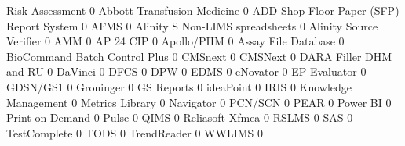 \documentclass{article}
\begin{document}
\begin{Schunk}
\begin{Soutput}
                                           Risk Assessment
                                                         0
  Abbott Transfusion Medicine                            0
  ADD Shop Floor Paper (SFP) Report System               0
  AFMS                                                   0
  Alinity S Non-LIMS spreadsheets                        0
  Alinity Source Verifier                                0
  AMM                                                    0
  AP 24 CIP                                              0
  Apollo/PHM                                             0
  Assay File Database                                    0
  BioCommand Batch Control Plus                          0
  CMSnext                                                0
  CMSNext                                                0
  DARA Filler DHM and RU                                 0
  DaVinci                                                0
  DFCS                                                   0
  DPW                                                    0
  EDMS                                                   0
  eNovator                                               0
  EP Evaluator                                           0
  GDSN/GS1                                               0
  Groninger                                              0
  GS Reports                                             0
  ideaPoint                                              0
  IRIS                                                   0
  Knowledge Management                                   0
  Metrics Library                                        0
  Navigator                                              0
  PCN/SCN                                                0
  PEAR                                                   0
  Power BI                                               0
  Print on Demand                                        0
  Pulse                                                  0
  QIMS                                                   0
  Reliasoft Xfmea                                        0
  RSLMS                                                  0
  SAS                                                    0
  TestComplete                                           0
  TODS                                                   0
  TrendReader                                            0
  WWLIMS                                                 0
                                          

\end{Soutput}
\end{Schunk}
\end{document}
